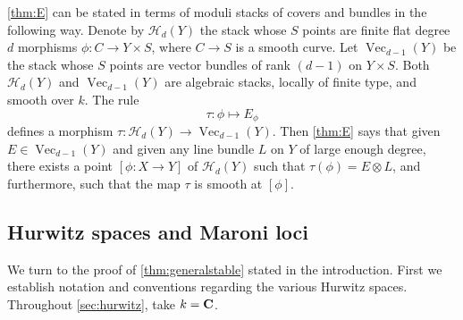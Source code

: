 \documentclass[11 pt]{amsart}
\renewcommand{\k}{k}
\renewcommand{\Vec}{\operatorname{Vec}}
\providecommand {\C}{{\bf C}}
\providecommand {\from}{{\colon}}
\numberwithin{equation}{section}
\begin{document}
\begin{remark}\label{rem:stack}
  \autoref{thm:E} can be stated in terms of moduli stacks of covers and bundles in the following way.
  Denote by $\mathcal H_d(Y)$ the stack whose $S$ points are finite flat degree $d$ morphisms $\phi \from C \to Y \times S$, where $C \to S$ is a smooth curve.
  Let $\Vec_{d-1}(Y)$ be the stack whose $S$ points are vector bundles of rank $(d-1)$ on $Y \times S$.
  Both $\mathcal H_d(Y)$ and $\Vec_{d-1}(Y)$ are algebraic stacks, locally of finite type, and smooth over $\k$.
  The rule
  \[ \tau \from \phi \mapsto E_\phi\]
  defines a morphism $\tau \from \mathcal H_d(Y) \to \Vec_{d-1}(Y)$.
  Then \autoref{thm:E} says that given $E \in \Vec_{d-1}(Y)$ and given any line bundle $L$ on $Y$ of large enough degree, there exists a point $[\phi \from X \to Y]$ of $\mathcal H_d(Y)$ such that $\tau(\phi) = E \otimes L$, and furthermore, such that the map $\tau$ is smooth at $[\phi]$.
\end{remark}

\subsection{Hurwitz spaces and Maroni loci}\label{sec:hurwitz}
We turn to the proof of \autoref{thm:generalstable} stated in the introduction.
First we establish notation and conventions regarding the various Hurwitz spaces.
Throughout \autoref{sec:hurwitz}, take $\k = \C$.
\end{document}
